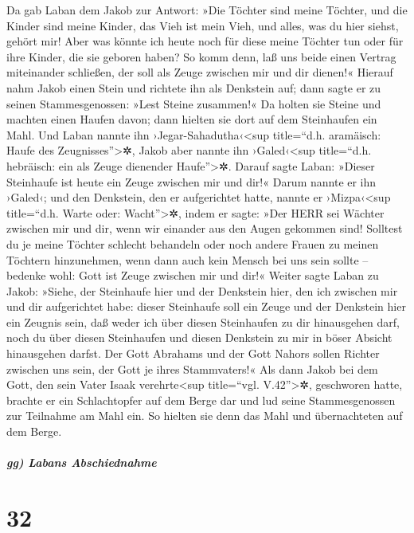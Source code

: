  Da gab Laban dem Jakob zur Antwort: »Die Töchter sind
meine Töchter, und die Kinder sind meine Kinder, das Vieh ist mein Vieh,
und alles, was du hier siehst, gehört mir! Aber was könnte ich heute
noch für diese meine Töchter tun oder für ihre Kinder, die sie geboren
haben?  So komm denn, laß uns beide einen Vertrag
miteinander schließen, der soll als Zeuge zwischen mir und dir dienen!«
 Hierauf nahm Jakob einen Stein und richtete ihn als
Denkstein auf;  dann sagte er zu seinen Stammesgenossen:
»Lest Steine zusammen!« Da holten sie Steine und machten einen Haufen
davon; dann hielten sie dort auf dem Steinhaufen ein Mahl.
 Und Laban nannte ihn ›Jegar-Sahadutha‹\textless sup
title=``d.h. aramäisch: Haufe des Zeugnisses''\textgreater✲, Jakob aber
nannte ihn ›Galed‹\textless sup title=``d.h. hebräisch: ein als Zeuge
dienender Haufe''\textgreater✲.  Darauf sagte Laban:
»Dieser Steinhaufe ist heute ein Zeuge zwischen mir und dir!« Darum
nannte er ihn ›Galed‹;  und den Denkstein, den er
aufgerichtet hatte, nannte er ›Mizpa‹\textless sup title=``d.h. Warte
oder: Wacht''\textgreater✲, indem er sagte: »Der HERR sei Wächter
zwischen mir und dir, wenn wir einander aus den Augen gekommen sind!
 Solltest du je meine Töchter schlecht behandeln oder
noch andere Frauen zu meinen Töchtern hinzunehmen, wenn dann auch kein
Mensch bei uns sein sollte -- bedenke wohl: Gott ist Zeuge zwischen mir
und dir!«  Weiter sagte Laban zu Jakob: »Siehe, der
Steinhaufe hier und der Denkstein hier, den ich zwischen mir und dir
aufgerichtet habe:  dieser Steinhaufe soll ein Zeuge und
der Denkstein hier ein Zeugnis sein, daß weder ich über diesen
Steinhaufen zu dir hinausgehen darf, noch du über diesen Steinhaufen und
diesen Denkstein zu mir in böser Absicht hinausgehen darfst.
 Der Gott Abrahams und der Gott Nahors sollen Richter
zwischen uns sein, der Gott je ihres Stammvaters!« Als dann Jakob bei
dem Gott, den sein Vater Isaak verehrte\textless sup title=``vgl.
V.42''\textgreater✲, geschworen hatte,  brachte er ein
Schlachtopfer auf dem Berge dar und lud seine Stammesgenossen zur
Teilnahme am Mahl ein. So hielten sie denn das Mahl und übernachteten
auf dem Berge.

\hypertarget{gg-labans-abschiednahme}{%
\subparagraph{gg) Labans Abschiednahme}\label{gg-labans-abschiednahme}}

\hypertarget{section-31}{%
\section{32}\label{section-31}}

